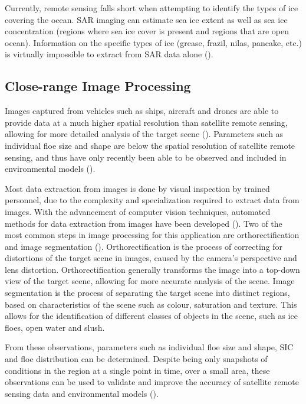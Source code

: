 Currently, remote sensing falls short when attempting to identify the types of ice covering the ocean. \ac{SAR} imaging can estimate sea ice extent as well as sea ice concentration (regions where sea ice cover is present and regions that are open ocean). Information on the specific types of ice (grease, frazil, nilas, pancake, etc.) is virtually impossible to extract from \ac{SAR} data alone (\cite{zakhvatkinaSatelliteSARDatabased2019}).

\subsection{Close-range Image Processing}
\label{subsec:ch2.section4.subsec2}

Images captured from vehicles such as ships, aircraft and drones are able to provide data at a much higher spatial resolution than satellite remote sensing, allowing for more detailed analysis of the target scene (\cite{tersigniHighResolutionThermalImaging2023}). Parameters such as individual floe size and shape are below the spatial resolution of satellite remote sensing, and thus have only recently been able to be observed and included in environmental models (\cite{alberelloThreedimensionalImagingWaves2022}).

Most data extraction from images is done by visual inspection by trained personnel, due to the complexity and specialization required to extract data from images. With the advancement of computer vision techniques, automated methods for data extraction from images have been developed (\cite{weisslingEISCAMDigitalImage2009}). Two of the most common steps in image processing for this application are orthorectification and image segmentation (\cite{sandruSeaiceFieldAnalysis2025}). Orthorectification is the process of correcting for distortions of the target scene in images, caused by the camera's perspective and lens distortion. Orthorectification generally transforms the image into a top-down view of the target scene, allowing for more accurate analysis of the scene. Image segmentation is the process of separating the target scene into distinct regions, based on characteristics of the scene such as colour, saturation and texture. This allows for the identification of different classes of objects in the scene, such as ice floes, open water and slush. 

From these observations, parameters such as individual floe size and shape, \ac{SIC} and floe distribution can be determined. Despite being only snapshots of conditions in the region at a single point in time, over a small area, these observations can be used to validate and improve the accuracy of satellite remote sensing data and environmental models (\cite{alberelloThreedimensionalImagingWaves2022}).

